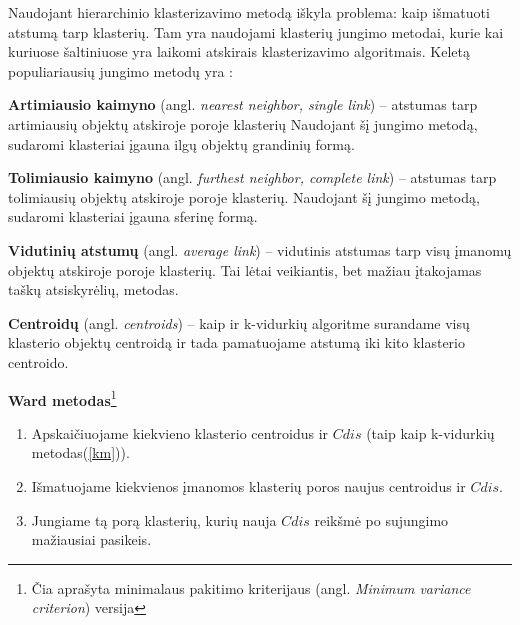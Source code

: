 \documentclass{VUMIFInfKursinis}
\newcommand{\ltang}[2]{#1 (angl. \textit{#2})}
\begin{document}
Naudojant hierarchinio klasterizavimo metodą iškyla problema: kaip
išmatuoti atstumą tarp klasterių. Tam yra naudojami klasterių jungimo
metodai, kurie kai kuriuose šaltiniuose yra laikomi atskirais
klasterizavimo algoritmais. Keletą populiariausių jungimo metodų yra \cite{slaclc}:

\ltang{\textbf{Artimiausio kaimyno}}{nearest neighbor, single link}
 – atstumas tarp artimiausių
objektų atskiroje poroje klasterių Naudojant šį jungimo metodą, sudaromi
klasteriai įgauna ilgų objektų grandinių formą.

\ltang{\textbf{Tolimiausio kaimyno}}{furthest neighbor,
complete link} – atstumas tarp tolimiausių
objektų atskiroje poroje klasterių. Naudojant šį jungimo metodą,
sudaromi klasteriai įgauna sferinę formą.

\ltang{\textbf{Vidutinių atstumų}}{average link} –
vidutinis atstumas tarp visų įmanomų objektų
atskiroje poroje klasterių. Tai lėtai veikiantis, bet mažiau įtakojamas
taškų atsiskyrėlių, metodas.

\ltang{\textbf{Centroidų}}{centroids} – kaip ir k-vidurkių algoritme
 surandame visų klasterio objektų
centroidą ir tada pamatuojame atstumą iki kito klasterio centroido.

\textbf{Ward metodas}\footnote{Čia aprašyta \ltang{minimalaus pakitimo
  kriterijaus}{Minimum variance criterion} versija}

\begin{enumerate}
\item
  Apskaičiuojame kiekvieno klasterio centroidus ir $Cdis$ (taip kaip k-vidurkių metodas(\ref{km})).
\item
  Išmatuojame kiekvienos įmanomos klasterių poros naujus centroidus ir
  $Cdis$.
\item
  Jungiame tą porą klasterių, kurių nauja $Cdis$ reikšmė po
  sujungimo mažiausiai pasikeis.
\end{enumerate}
\end{document}
